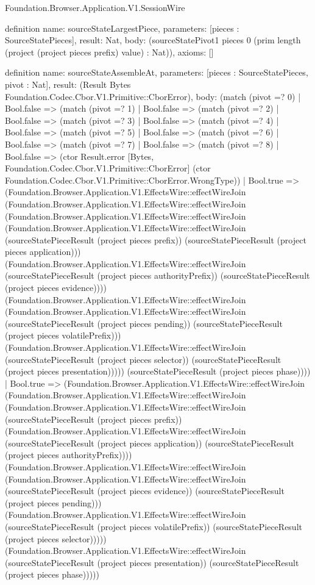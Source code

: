 \begin{lexlean}{Foundation.Browser.Application.V1.SessionWire}
\begin{semanticmodule}
definition{
  name: sourceStateLargestPiece,
  parameters: [pieces : SourceStatePieces],
  result: Nat,
  body: (sourceStatePivot1 pieces 0 (prim length (project (project pieces prefix) value) : Nat)),
  axioms: []
}

definition{
  name: sourceStateAssembleAt,
  parameters: [pieces : SourceStatePieces, pivot : Nat],
  result: (Result Bytes Foundation.Codec.Cbor.V1.Primitive::CborError),
  body: (match (pivot =? 0)
    | Bool.false => (match (pivot =? 1)
      | Bool.false => (match (pivot =? 2)
        | Bool.false => (match (pivot =? 3)
          | Bool.false => (match (pivot =? 4)
            | Bool.false => (match (pivot =? 5)
              | Bool.false => (match (pivot =? 6)
                | Bool.false => (match (pivot =? 7)
                  | Bool.false => (match (pivot =? 8)
                    | Bool.false => (ctor Result.error [Bytes, Foundation.Codec.Cbor.V1.Primitive::CborError] (ctor Foundation.Codec.Cbor.V1.Primitive::CborError.WrongType))
                    | Bool.true => (Foundation.Browser.Application.V1.EffectsWire::effectWireJoin (Foundation.Browser.Application.V1.EffectsWire::effectWireJoin (Foundation.Browser.Application.V1.EffectsWire::effectWireJoin (Foundation.Browser.Application.V1.EffectsWire::effectWireJoin (sourceStatePieceResult (project pieces prefix)) (sourceStatePieceResult (project pieces application))) (Foundation.Browser.Application.V1.EffectsWire::effectWireJoin (sourceStatePieceResult (project pieces authorityPrefix)) (sourceStatePieceResult (project pieces evidence)))) (Foundation.Browser.Application.V1.EffectsWire::effectWireJoin (Foundation.Browser.Application.V1.EffectsWire::effectWireJoin (sourceStatePieceResult (project pieces pending)) (sourceStatePieceResult (project pieces volatilePrefix))) (Foundation.Browser.Application.V1.EffectsWire::effectWireJoin (sourceStatePieceResult (project pieces selector)) (sourceStatePieceResult (project pieces presentation))))) (sourceStatePieceResult (project pieces phase))))
                  | Bool.true => (Foundation.Browser.Application.V1.EffectsWire::effectWireJoin (Foundation.Browser.Application.V1.EffectsWire::effectWireJoin (Foundation.Browser.Application.V1.EffectsWire::effectWireJoin (sourceStatePieceResult (project pieces prefix)) (Foundation.Browser.Application.V1.EffectsWire::effectWireJoin (sourceStatePieceResult (project pieces application)) (sourceStatePieceResult (project pieces authorityPrefix)))) (Foundation.Browser.Application.V1.EffectsWire::effectWireJoin (Foundation.Browser.Application.V1.EffectsWire::effectWireJoin (sourceStatePieceResult (project pieces evidence)) (sourceStatePieceResult (project pieces pending))) (Foundation.Browser.Application.V1.EffectsWire::effectWireJoin (sourceStatePieceResult (project pieces volatilePrefix)) (sourceStatePieceResult (project pieces selector))))) (Foundation.Browser.Application.V1.EffectsWire::effectWireJoin (sourceStatePieceResult (project pieces presentation)) (sourceStatePieceResult (project pieces phase)))))
}
\end{semanticmodule}
\end{lexlean}
